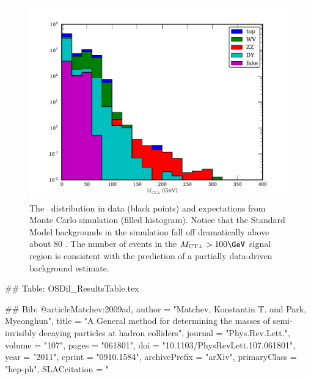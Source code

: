 \begin{figure}
    \begin{center}
        \includegraphics[]{OSDil_MCTDistribution}
        \caption{The \mctp\ distribution in data (black points) and expectations from Monte Carlo simulation (filled histogram). Notice that the Standard Model backgrounds in the simulation fall off dramatically above about 80 \GeV. The number of events in the $\mctp > 100\GeV$ signal region is consistent with the prediction of a partially data-driven background estimate.}
        \label{fig:OSDil_MCTDistribution}
    \end{center}
\end{figure}

## Table:
OSDil_ResultsTable.tex

## Bib:
@article{Matchev:2009ad,
      author         = "Matchev, Konstantin T. and Park, Myeonghun",
      title          = "{A General method for determining the masses of
                        semi-invisibly decaying particles at hadron colliders}",
      journal        = "Phys.Rev.Lett.",
      volume         = "107",
      pages          = "061801",
      doi            = "10.1103/PhysRevLett.107.061801",
      year           = "2011",
      eprint         = "0910.1584",
      archivePrefix  = "arXiv",
      primaryClass   = "hep-ph",
      SLACcitation   = "%
}
